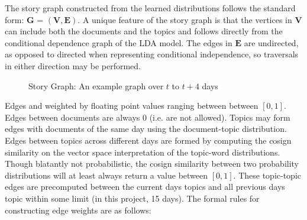 \documentclass[10pt,twocolumn]{article}
\begin{document}
The story graph constructed from the learned distributions follows the standard form: $\mathbf{G}$ = $(\mathbf{V}, \mathbf{E})$.  A unique feature of the story graph is that the vertices in $\mathbf{V}$ can include both the documents and the topics and follows directly from the conditional dependence graph of the LDA model.  The edges in $\mathbf{E}$ are undirected, as opposed to directed when representing conditional independence, so traversals in either direction may be performed.  

\begin{figure}[htp] 
\caption{Story Graph: An example graph over $t$ to $t+4$ days}
\end{figure}  

Edges and weighted by floating point values ranging between between $[0, 1]$.  Edges between documents are always 0 (i.e. are not allowed).  Topics may form edges with documents of the same day using the document-topic distribution.  Edges between topics across different days are formed by computing the cosign similarity on the vector space interpretation of the topic-word distributions.  Though blatantly not probabilistic, the cosign similarity between two probability distributions will at least always return a value between $[0,1]$. These topic-topic edges are precomputed between the current days topics and all previous days topic within some limit (in this project, 15 days).  The formal rules for constructing edge weights are as follows:  
\end{document}

